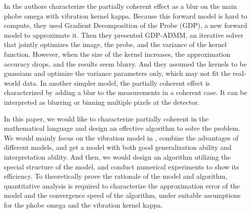 \documentclass{article}
\numberwithin{equation}{section}
\begin{document}
In \cite{chang} the authors characterize the partially coherent effect as a blur on the main phobe omega with vibration kernel kappa. Because this forward model is hard to compute, they used Gradient Decomposition of the Probe (GDP), a new forward model to approximate it. Then they presented GDP-ADMM, an iterative solver that jointly optimizes the image, the probe, and the variance of the kernel function. However, when the size of the kernel increases, the approximation accuracy drops, and the results seem blurry. And they assumed the kernels to be guassians and optimize the variance parameters only, which may not fit the real-world data. In another simpler model, the partially coherent effect is characterized by adding a blur to the measurements in a coherent case. It can be interpreted as blurring or binning multiple pixels at the detector.

In this paper, we would like to characterize partially coherent in the mathematical language and design an effective algorithm to solve the problem. We would mainly focus on the vibration model in \cite{chang}, combine the advantages of different models, and get a model with both good generalization ability and interpretation ability. And then, we would design an algorithm utilizing the special structure of the model, and conduct numerical experiments to show its efficiency. To theoretically prove the rationale of the model and algorithm, quantitative analysis is required to characterize the approximation error of the model and the convergence speed of the algorithm, under suitable assumptions for the phobe omega and the vibration kernel kappa. 











\end{document}
